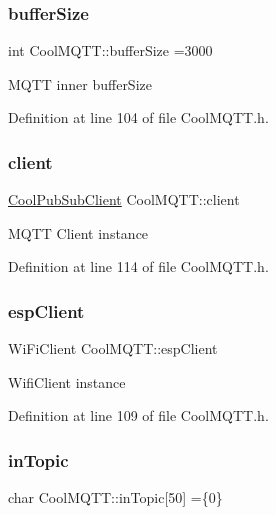 \subsubsection{\texorpdfstring{buffer\+Size}{bufferSize}}
{\footnotesize\ttfamily int Cool\+M\+Q\+T\+T\+::buffer\+Size =3000\hspace{0.3cm}{\ttfamily [private]}}

M\+Q\+TT inner buffer\+Size 

Definition at line 104 of file Cool\+M\+Q\+T\+T.\+h.

\mbox{\label{class_cool_m_q_t_t_afed1372683c44893b4668d0f1771f514}} 
\subsubsection{\texorpdfstring{client}{client}}
{\footnotesize\ttfamily \hyperlink{class_cool_pub_sub_client}{Cool\+Pub\+Sub\+Client} Cool\+M\+Q\+T\+T\+::client\hspace{0.3cm}{\ttfamily [private]}}

M\+Q\+TT Client instance 

Definition at line 114 of file Cool\+M\+Q\+T\+T.\+h.

\mbox{\label{class_cool_m_q_t_t_acc30a0200967374a524092a8a806502a}} 
\subsubsection{\texorpdfstring{esp\+Client}{espClient}}
{\footnotesize\ttfamily Wi\+Fi\+Client Cool\+M\+Q\+T\+T\+::esp\+Client\hspace{0.3cm}{\ttfamily [private]}}

Wifi\+Client instance 

Definition at line 109 of file Cool\+M\+Q\+T\+T.\+h.

\mbox{\label{class_cool_m_q_t_t_a4492f52a441e83cc5151010317fdb52d}} 
\subsubsection{\texorpdfstring{in\+Topic}{inTopic}}
{\footnotesize\ttfamily char Cool\+M\+Q\+T\+T\+::in\+Topic\mbox{[}50\mbox{]} =\{\textquotesingle{}0\textquotesingle{}\}\hspace{0.3cm}{\ttfamily [private]}}

